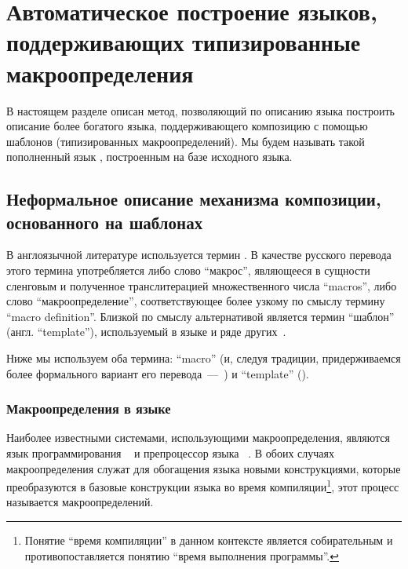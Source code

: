 \chapter{Автоматическое построение языков, поддерживающих типизированные макроопределения}

В настоящем разделе описан метод, позволяющий по описанию языка построить описание более богатого языка, поддерживающего композицию с помощью шаблонов (типизированных макроопределений). Мы будем называть такой пополненный язык , построенным на базе исходного языка.

\section{Неформальное описание механизма композиции, основанного на шаблонах}

\begin{Note}[О терминологии]
В англоязычной литературе используется термин  \cite{MacroML,Cpp,Nemerle}. 
В качестве русского перевода этого термина употребляется либо слово ``макрос'', являющееся в сущности сленговым и полученное транслитерацией множественного числа ``macros'', либо слово ``макроопределение'', соответствующее более узкому по смыслу термину ``macro definition''. 
Близкой по смыслу альтернативой является термин ``шаблон'' (англ. ``template''), используемый в языке 
\cite{C++} 
и ряде других~\cite{HTMP,Velocity,UML}. 

Ниже мы используем оба термина: ``macro'' (и, следуя традиции, придерживаемся более формального вариант его перевода~---~) и ``template'' ().
\end{Note}

\subsection{Макроопределения в языке }

Наиболее известными системами, использующими макроопределения, являются язык программирования ~\cite{Lisp} и препроцессор языка ~\cite{C, Cpp}. В обоих случаях макроопределения служат для обогащения языка новыми конструкциями, которые преобразуются в базовые конструкции языка во время компиляции\footnote{Понятие ``время компиляции'' в данном контексте является собирательным и противопоставляется понятию ``время выполнения программы''.}, этот процесс называется  макроопределений.


